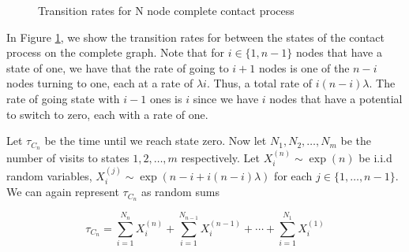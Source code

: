 \documentclass{article}
\theoremstyle{plain}
\theoremstyle{definition}
\theoremstyle{remark}
\numberwithin{equation}{section}
\begin{document}
\begin{figure}[H]
    \centering
    \caption{Transition rates for N node complete contact process}
    \label{fig:complete_contact_n_node_rates}
\end{figure}

In Figure \ref{fig:complete_contact_n_node_rates}, we show the transition rates for between the states of the contact process on the complete graph.
Note that for $i \in \{1, n - 1\} $ nodes that have a state of one, we have that the rate of going to $i + 1$ nodes is one of the $n - i$ nodes turning to one, each at a rate of $\lambda i$.
Thus, a total rate of $i (n - i) \lambda$.
The rate of going state with $i - 1$ ones is $i$ since we have $i$ nodes that have a potential to switch to zero, each with a rate of one.

Let $\tau_{C_n}$ be the time until we reach state zero.
Now let $N_1, N_2, \ldots, N_m$ be the number of visits to states $1, 2, \ldots, m$ respectively.
Let $X_i^{(n)} \sim \exp(n)$ be i.i.d random variables, $X_i^{(j)} \sim \exp(n - i + i(n - i)\lambda)$ for each $j \in \{1, \ldots, n-1\}$.
We can again represent $\tau_{C_n}$ as random sums

\begin{equation}\label{eq:wait_contact_sum}
    \tau_{C_n} = \sum_{i = 1}^{N_n} X_i^{(n)} + \sum_{i = 1}^{N_{n - 1}} X_i^{(n - 1)} + \cdots + \sum_{i = 1}^{N_1} X_i^{(1)}
\end{equation}
\end{document}

